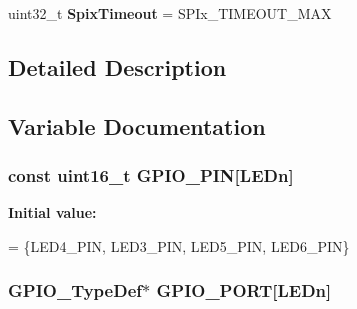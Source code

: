 \begin{DoxyCompactItemize}
\item 
\hypertarget{group__STM32F4__DISCOVERY__LOW__LEVEL__Private__Variables_ga4a2ea0dff94f06e505f867493c813f0f}{uint32\-\_\-t {\bfseries Spix\-Timeout} = S\-P\-Ix\-\_\-\-T\-I\-M\-E\-O\-U\-T\-\_\-\-M\-A\-X}\label{group__STM32F4__DISCOVERY__LOW__LEVEL__Private__Variables_ga4a2ea0dff94f06e505f867493c813f0f}

\end{DoxyCompactItemize}


\subsection{Detailed Description}


\subsection{Variable Documentation}
\hypertarget{group__STM32F4__DISCOVERY__LOW__LEVEL__Private__Variables_ga7f675ed2b6edb74e2d8406f8a4a677f5}{
\subsubsection[{G\-P\-I\-O\-\_\-\-P\-I\-N}]{\setlength{\rightskip}{0pt plus 5cm}const uint16\-\_\-t G\-P\-I\-O\-\_\-\-P\-I\-N\mbox{[}L\-E\-Dn\mbox{]}}}\label{group__STM32F4__DISCOVERY__LOW__LEVEL__Private__Variables_ga7f675ed2b6edb74e2d8406f8a4a677f5}
{\bfseries Initial value\-:}
\begin{DoxyCode}
= \{LED4\_PIN, 
                                 LED3\_PIN, 
                                 LED5\_PIN,
                                 LED6\_PIN\}
\end{DoxyCode}
\hypertarget{group__STM32F4__DISCOVERY__LOW__LEVEL__Private__Variables_gadfddcc182c40163aaa7b3c7f36e42ed9}{
\subsubsection[{G\-P\-I\-O\-\_\-\-P\-O\-R\-T}]{\setlength{\rightskip}{0pt plus 5cm}G\-P\-I\-O\-\_\-\-Type\-Def$\ast$ G\-P\-I\-O\-\_\-\-P\-O\-R\-T\mbox{[}L\-E\-Dn\mbox{]}}}\label{group__STM32F4__DISCOVERY__LOW__LEVEL__Private__Variables_gadfddcc182c40163aaa7b3c7f36e42ed9}

